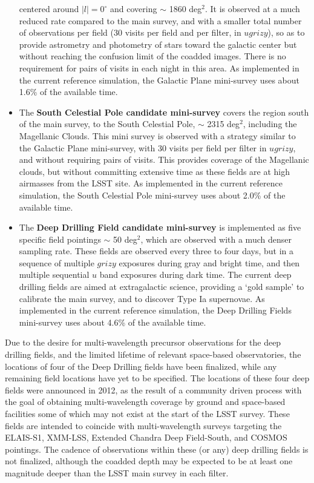 \documentclass[DM,lsstdraft,toc,usenatbib]{lsstdoc}
\begin{document}
\begin{itemize}
centered around $|l| = 0^\circ$ and covering $\sim$ 1860 deg$^2$.  It is observed at a much reduced rate compared to the main survey, 
and with a smaller total number of observations per field (30 visits per field and per filter, in $ugrizy$), so as to
provide astrometry and photometry of stars toward the galactic center but without reaching the confusion limit of the coadded images.
There is no requirement for pairs of visits in each night in this area. As implemented in the current reference simulation, the Galactic Plane mini-survey uses
about 1.6\% of the available time.
\item The {\bf South Celestial Pole candidate mini-survey} covers the region south of the main survey, to the South Celestial Pole, $\sim$ 2315 deg$^2$,
including the Magellanic Clouds. 
This mini survey is observed with a strategy similar to the Galactic Plane mini-survey, with 30 visits per field per filter in $ugrizy$, 
and without requiring pairs of visits. This provides coverage of the Magellanic clouds, but without committing extensive time as these fields are
at high airmasses from the LSST site. As implemented in the current reference simulation, the South Celestial Pole mini-survey uses
about 2.0\% of the available time.
\item The {\bf Deep Drilling Field candidate mini-survey} is implemented as five specific field pointings $\sim$ 50 deg$^2$, 
which are observed with a much denser sampling rate. These fields
are observed every three to four days, but in a sequence of multiple $grizy$ exposures during gray and bright time, and then
multiple sequential $u$ band exposures during dark time. The current deep drilling fields are aimed at extragalactic
science, providing a `gold sample' to calibrate the main survey, and to discover Type Ia supernovae. 
As implemented in the current reference simulation, the Deep Drilling Fields mini-survey uses about 4.6\% of the available time.
\end{itemize}

Due to the desire for multi-wavelength precursor observations for the deep drilling fields, and the limited lifetime of relevant 
space-based observatories, the locations of four of the Deep Drilling fields have been finalized, while any remaining field locations 
have yet to be specified. The locations of these four deep fields were announced in 2012, as the result of a community driven process 
with the goal of obtaining multi-wavelength
coverage by ground and space-based facilities some of which may not exist at the start of the LSST survey.
These fields are intended to coincide with multi-wavelength surveys targeting the ELAIS-S1, XMM-LSS, Extended Chandra Deep Field-South, 
and COSMOS pointings. The cadence of observations within these (or any) deep drilling fields is not finalized, although the coadded
depth may be expected to be at least one magnitude deeper than the LSST main survey in each filter.
\end{document}
